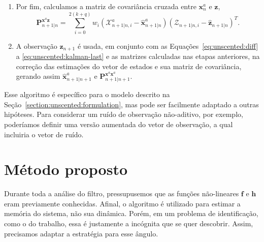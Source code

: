 \begin{enumerate}
    \item Por fim, calculamos a matriz de covariância cruzada entre $\mathbf{x}_n^a$ e $\mathbf{z}$,
    \begin{equation}
        \mathbf{P}^{\mathbf{x}^a\mathbf{z}}_{n+1|n} = \sum_{i=0}^{2(k+q)} w_i (\bm{\mathcal{X}}_{n+1|n,i}^a - \hat{\mathbf{x}}_{n+1|n}^a) (\bm{\mathcal{Z}}_{n+1|n,i} - \hat{\mathbf{z}}_{n+1|n})^T.
    \end{equation}        

    \item A observação $\mathbf{z}_{n+1}$ é usada, em conjunto com as Equações~\eqref{eq:unscented:diff} a \eqref{eq:unscented:kalman-last} e as matrizes calculadas nas etapas anteriores, na correção das estimações do vetor de estados e sua matriz de covariância, gerando assim $\hat{\mathbf{x}}_{n+1|n+1}^a$ e $\mathbf{P}^{\mathbf{x}^a\mathbf{x}^a}_{n+1|n+1}$.
\end{enumerate}

Esse algoritmo é específico para o modelo descrito na Seção~\ref{section:unscented:formulation}, mas pode ser facilmente adaptado a outras hipóteses. Para considerar um ruído de observação não-aditivo, por exemplo, poderíamos definir uma versão aumentada do vetor de observação, a qual incluiria o vetor de ruído.

\section{Método proposto}
\label{section:unscented:model}

Durante toda a análise do filtro, pressupusemos que as funções não-lineares $\mathbf{f}$ e $\mathbf{h}$ eram previamente conhecidas. Afinal, o algoritmo é utilizado para estimar a memória do sistema, não sua dinâmica. Porém, em um problema de identificação, como o do trabalho, essa é justamente a incógnita que se quer descobrir. Assim, precisamos adaptar a estratégia para esse ângulo.

